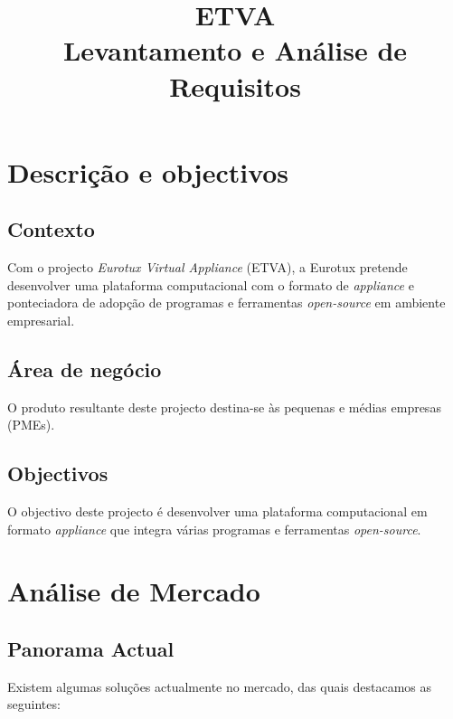 \documentclass[a4paper,11pt,titlepage]{article}
\author{}
\title{ETVA \\ Levantamento e Análise de Requisitos}
\begin{document}
\maketitle
\tableofcontents

\newpage

\section{Descrição e objectivos}

\subsection{Contexto}

Com o projecto \emph{Eurotux Virtual Appliance} (ETVA), a Eurotux pretende desenvolver uma plataforma computacional com o formato de \emph{appliance} e ponteciadora de adopção de programas e ferramentas \emph{open-source} em ambiente empresarial.

\subsection{Área de negócio}
O produto resultante deste projecto destina-se às pequenas e médias empresas (PMEs).
\subsection{Objectivos}
O objectivo deste projecto é desenvolver uma plataforma computacional em formato \emph{appliance} que integra várias programas e ferramentas \emph{open-source}.

\section{Análise de Mercado}
\subsection{Panorama Actual}

Existem algumas soluções actualmente no mercado, das quais destacamos as seguintes:
\end{document}
